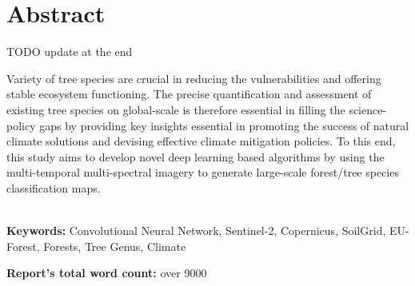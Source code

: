 \chapter*{\center \Large  Abstract}
TODO update at the end

Variety of tree species are crucial in reducing the vulnerabilities and offering stable ecosystem functioning. The precise quantification and assessment of existing tree species on global-scale is therefore essential in filling the science-policy gaps by providing key insights essential in promoting the success of natural climate solutions and devising effective climate mitigation policies. To this end, this study aims to develop novel deep learning based algorithms by using the multi-temporal multi-spectral imagery to generate large-scale forest/tree species classification maps.

~\\[1cm]
\noindent %
\textbf{Keywords:} Convolutional Neural Network, Sentinel-2, Copernicus, SoilGrid, EU-Forest, Forests, Tree Genus, Climate

\vfill
\noindent
\textbf{Report's total word count:} over 9000